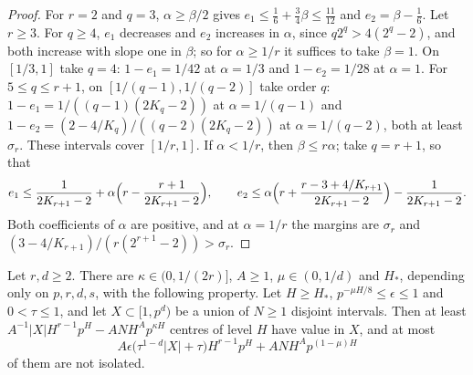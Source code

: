 \documentclass[11pt]{article}
\begin{document}
\begin{proof}
For $r=2$ and $q=3$, $\alpha\ge\beta/2$ gives $e_1\le\frac16+\frac34\beta\le\frac{11}{12}$ and
$e_2=\beta-\frac16$. Let $r\ge3$. For $q\ge4$, $e_1$ decreases and $e_2$ increases in $\alpha$, since
$q2^q>4(2^q-2)$, and both increase with slope one in $\beta$; so for $\alpha\ge1/r$ it suffices to take
$\beta=1$. On $[1/3,1]$ take $q=4$: $1-e_1=1/42$ at $\alpha=1/3$ and $1-e_2=1/28$ at $\alpha=1$. For
$5\le q\le r+1$, on $[1/(q-1),1/(q-2)]$ take order $q$: $1-e_1=1/((q-1)(2K_q-2))$ at $\alpha=1/(q-1)$ and
$1-e_2=(2-4/K_q)/((q-2)(2K_q-2))$ at $\alpha=1/(q-2)$, both at least $\sigma_r$. These intervals cover
$[1/r,1]$. If $\alpha<1/r$, then $\beta\le r\alpha$; take $q=r+1$, so that
\[
e_1\le\frac1{2K_{r+1}-2}+\alpha\Bigl(r-\frac{r+1}{2K_{r+1}-2}\Bigr),\qquad
e_2\le\alpha\Bigl(r+\frac{r-3+4/K_{r+1}}{2K_{r+1}-2}\Bigr)-\frac1{2K_{r+1}-2}.
\]
Both coefficients of $\alpha$ are positive, and at $\alpha=1/r$ the margins are $\sigma_r$ and
$(3-4/K_{r+1})/(r(2^{r+1}-2))>\sigma_r$.
\end{proof}

\begin{lemma}\label{lem:avgiso}
Let $r,d\ge2$. There are $\kappa\in(0,1/(2r)]$, $A\ge1$, $\mu\in(0,1/d)$ and $H_*$, depending only on
$p,r,d,s$, with the following property. Let $H\ge H_*$, $p^{-\mu H/8}\le\epsilon\le1$ and $0<\tau\le1$,
and let $X\subset[1,p^d)$ be a union of $N\ge1$ disjoint intervals. Then at least
$A^{-1}|X|H^{r-1}p^H-ANH^Ap^{\kappa H}$ centres of level $H$ have value in $X$, and at most
\[
A\epsilon\bigl(\tau^{1-d}|X|+\tau\bigr)H^{r-1}p^H+ANH^Ap^{(1-\mu)H}
\]
of them are not isolated.
\end{lemma}
\end{document}
